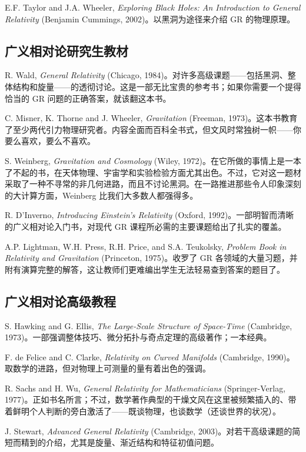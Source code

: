 E.F. Taylor and J.A. Wheeler, \emph{Exploring Black Holes: An Introduction to General Relativity} (Benjamin Cummings, 2002)。以黑洞为途径来介绍 GR 的物理原理。

\subsection*{广义相对论研究生教材}

R. Wald, \emph{General Relativity} (Chicago, 1984)。对许多高级课题——包括黑洞、整体结构和旋量——的透彻讨论。这是一部无比宝贵的参考书；如果你需要一个提得恰当的 GR 问题的正确答案，就该翻这本书。

C. Misner, K. Thorne and J. Wheeler, \emph{Gravitation} (Freeman, 1973)。这本书教育了至少两代引力物理研究者。内容全面而百科全书式，但文风时常独树一帜——你要么喜欢，要么不喜欢。

S. Weinberg, \emph{Gravitation and Cosmology} (Wiley, 1972)。在它所做的事情上是一本了不起的书，在天体物理、宇宙学和实验检验方面尤其出色。不过，它对这一题材采取了一种不寻常的非几何进路，而且不讨论黑洞。在一路推进那些令人印象深刻的大计算方面，Weinberg 比我们大多数人都强得多。

R. D'Inverno, \emph{Introducing Einstein's Relativity} (Oxford, 1992)。一部明智而清晰的广义相对论入门书，对现代 GR 课程所必需的主要课题给出了扎实的覆盖。

A.P. Lightman, W.H. Press, R.H. Price, and S.A. Teukolsky, \emph{Problem Book in Relativity and Gravitation} (Princeton, 1975)。收罗了 GR 各领域的大量习题，并附有演算完整的解答，这让教师们更难编出学生无法轻易查到答案的题目了。

\subsection*{广义相对论高级教程}

S. Hawking and G. Ellis, \emph{The Large-Scale Structure of Space-Time} (Cambridge, 1973)。一部强调整体技巧、微分拓扑与奇点定理的高级著作；一本经典。

F. de Felice and C. Clarke, \emph{Relativity on Curved Manifolds} (Cambridge, 1990)。取数学的进路，但对物理上可测量的量有着出色的强调。

R. Sachs and H. Wu, \emph{General Relativity for Mathematicians} (Springer-Verlag, 1977)。正如书名所言；不过，数学著作典型的干燥文风在这里被频繁插入的、带着鲜明个人判断的旁白激活了——既谈物理，也谈数学（还谈世界的状况）。

J. Stewart, \emph{Advanced General Relativity} (Cambridge, 2003)。对若干高级课题的简短而精到的介绍，尤其是旋量、渐近结构和特征初值问题。

